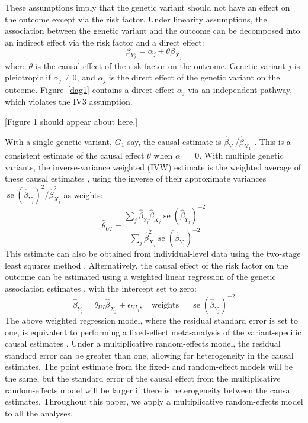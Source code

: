\documentclass[a4paper,12pt]{article}
\DeclareMathOperator{\se}{se} %
\begin{document}
\begin{bibunit}[wileyj]
These assumptions imply that the genetic variant should not have an effect on the outcome except via the risk factor. Under linearity assumptions, the association between the genetic variant and the outcome can be decomposed into an indirect effect via the risk factor and a direct effect:
\begin{equation}
\beta_{Yj} = \alpha_j + \theta \beta_{X_{j}}
\end{equation}
where $\theta$ is the causal effect of the risk factor on the outcome. Genetic variant $j$ is pleiotropic if $\alpha_j \neq 0$, and $\alpha_j$ is the direct effect of the genetic variant on the outcome. Figure~\ref{dag1} contains a direct effect $\alpha_j$ via an independent pathway, which violates the IV3 assumption.

\begin{center}
[Figure 1 should appear about here.]
\end{center}

With a single genetic variant, $G_1$ say, the causal estimate is $\hat{\beta}_{Y_{1}}/\hat{\beta}_{X_{1}}$ \cite{didelez2007}. This is a consistent estimate of the causal effect $\theta$ when $\alpha_1 = 0$. With multiple genetic variants, the inverse-variance weighted (IVW) estimate is the weighted average of these causal estimates \cite{johnson2013}, using the inverse of their approximate variances $\se(\hat{\beta}_{Y_{j}})^2/\hat{\beta}_{X_{j}}^2$ as weights:
\begin{equation}
\hat{\theta}_{UI} = \frac{\sum_j \hat{\beta}_{Y_{j}} \hat{\beta}_{X_{j}} \se(\hat{\beta}_{Y_{j}})^{-2}}{\sum_j \hat{\beta}_{X_{j}}^2 \se(\hat{\beta}_{Y_{j}})^{-2}} \label{eq:IVW_simple}
\end{equation}
This estimate can also be obtained from individual-level data using the two-stage least squares method \cite{angrist1995twostage}. Alternatively, the causal effect of the risk factor on the outcome can be estimated using a weighted linear regression of the genetic association estimates \cite{burgess2013ivw}, with the intercept set to zero:
\begin{equation}
\hat{\beta}_{Y_{j}} = \theta_{UI} \hat{\beta}_{X_{j}} + \epsilon_{UI_{j}}, \quad \mbox{weights = } \se(\hat{\beta}_{Y_{j}})^{-2} \label{eq:IVW}
\end{equation}
The above weighted regression model, where the residual standard error is set to one, is equivalent to performing a fixed-effect meta-analysis of the variant-specific causal estimates \cite{thompson1999}. Under a multiplicative random-effects model, the residual standard error can be greater than one, allowing for heterogeneity in the causal estimates.  The point estimate from the fixed- and random-effect models will be the same, but the standard error of the causal effect from the multiplicative random-effects model will be larger if there is heterogeneity between the causal estimates. Throughout this paper, we apply a multiplicative random-effects model to all the analyses.  


\end{bibunit}
\end{document}
